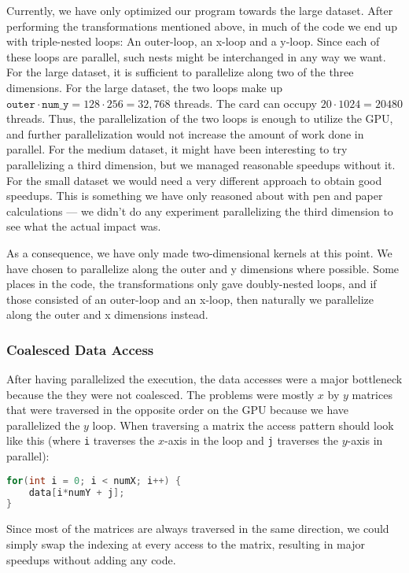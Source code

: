 \documentclass[11pt]{article}
\begin{document}
Currently, we have only optimized our program towards the large dataset.
After performing the transformations mentioned above, in much of the code we end up with triple-nested loops: An outer-loop, an x-loop and a y-loop. Since each of these loops are parallel, such nests might be interchanged in any way we want. For the large dataset, it is sufficient to parallelize along two of the three dimensions.
For the large dataset, the two loops make up $\mathtt{outer} \cdot \mathtt{num\_y} = 128 \cdot 256 = 32,768$ threads.
The card can occupy $20 \cdot 1024 = 20480$ threads.
Thus, the parallelization of the two loops is enough to utilize the GPU, and further parallelization would not increase the amount of work done in parallel.
For the medium dataset, it might have been interesting to try parallelizing a third dimension, but we managed reasonable speedups without it.
For the small dataset we would need a very different approach to obtain good speedups.
This is something we have only reasoned about with pen and paper calculations --- we didn't do any experiment parallelizing the third dimension to see what the actual impact was.

As a consequence, we have only made two-dimensional kernels at this point. We have chosen to parallelize along the outer and y dimensions where possible. Some places in the code, the transformations only gave doubly-nested loops, and if those consisted of an outer-loop and an x-loop, then naturally we parallelize along the outer and x dimensions instead.

\subsubsection{Coalesced Data Access}
After having parallelized the execution, the data accesses were a major bottleneck because the they were not coalesced.
The problems were mostly $x$ by $y$ matrices that were traversed in the opposite order on the GPU because we have parallelized the $y$ loop.
When traversing a matrix the access pattern should look like this (where \texttt{i} traverses the $x$-axis in the loop and \texttt{j} traverses the $y$-axis in parallel):
\begin{lstlisting}[language=C]
for(int i = 0; i < numX; i++) {
	data[i*numY + j];
}
\end{lstlisting}

Since most of the matrices are always traversed in the same direction, we could simply swap the indexing at every access to the matrix, resulting in major speedups without adding any code.
\end{document}
